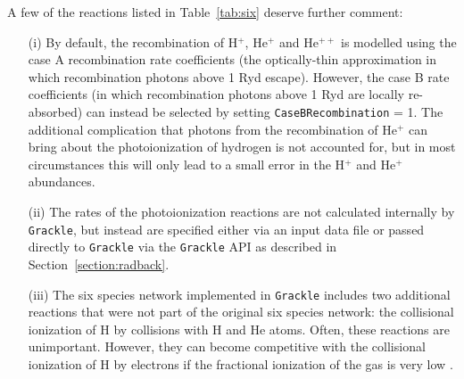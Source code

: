A few of the reactions listed in Table~\ref{tab:six} deserve further comment:
\begin{enumerate}
\item[(i)] By default, the recombination of
H$^{+}$, He$^{+}$ and He$^{++}$ is modelled using the case A
recombination rate coefficients (the optically-thin approximation in
which recombination photons above 1 Ryd escape). However, the case B
rate coefficients (in which recombination photons above 1 Ryd are
locally re-absorbed) can instead be selected by setting \texttt{CaseBRecombination} = 1. The additional complication that photons from the recombination of
He$^{+}$ can bring about the photoionization of hydrogen \citep[discussed in some detail in][]{1989agna.book.....O} is not accounted
for, but in most circumstances this will only lead to a small error in the H$^{+}$ and He$^{+}$ abundances. 
\item[(ii)] The rates of the photoionization reactions are not calculated internally by \texttt{Grackle}, but instead are specified either via an input data file or 
passed directly to \texttt{Grackle}  via the  \texttt{Grackle} API as described in Section~\ref{section:radback}.
\item[(iii)] The six species network implemented in \texttt{Grackle} includes two additional reactions that were not part of the original \citet{1997NewA....2..181A}
six species network: the collisional ionization of H by collisions with H and He atoms. Often, these reactions are unimportant. However, they 
can become competitive with the collisional ionization of H by electrons if the fractional ionization of the gas is very low \citep[see, e.g.][for an example of when this can be important]{2015MNRAS.451.2082G}.
\end{enumerate}

